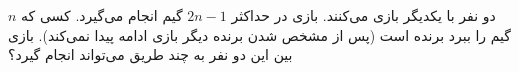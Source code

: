 \EXERCISE
دو نفر با یکدیگر بازی می‌کنند. بازی در حداکثر
$2n -1$
گیم انجام می‌گیرد. کسی که
$n$
گیم را ببرد برنده است (پس از مشخص شدن برنده دیگر بازی ادامه پیدا نمی‌کند). بازی بین این دو نفر به چند طریق می‌تواند انجام گیرد؟